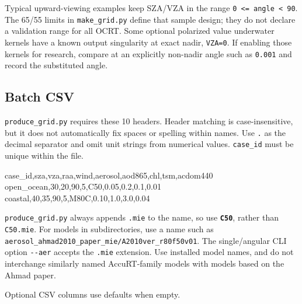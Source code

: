 Typical upward-viewing examples keep SZA/VZA in the range \texttt{0 <=\allowbreak{} angle < 90\textdegree{}}. The 65\textdegree{}/55\textdegree{} limits in \texttt{make\_\allowbreak{}grid.\allowbreak{}py} define that sample design; they do not declare a validation range for all OCRT. Some optional polarized value underwater kernels have a known output singularity at exact nadir, \texttt{VZA=\allowbreak{}0\textdegree{}}. If enabling those kernels for research, compare at an explicitly non-nadir angle such as \texttt{0.\allowbreak{}001\textdegree{}} and record the substituted angle.

\subsection{Batch CSV}
\label{sec:auto:06_python_batch:3.1}
\texttt{produce\_\allowbreak{}grid.\allowbreak{}py} requires these 10 headers. Header matching is case-insensitive, but it does not automatically fix spaces or spelling within names. Use \texttt{.\allowbreak{}} as the decimal separator and omit unit strings from numerical values. \texttt{case\_\allowbreak{}id} must be unique within the file.


\begin{ManualCode}
case_id,sza,vza,raa,wind,aerosol,aod865,chl,tsm,acdom440
open_ocean,30,20,90,5,C50,0.05,0.2,0.1,0.01
coastal,40,35,90,5,M80C,0.10,1.0,3.0,0.04
\end{ManualCode}

\texttt{produce\_\allowbreak{}grid.\allowbreak{}py} always appends \texttt{.\allowbreak{}mie} to the name, so use \textbf{\texttt{C50}}, rather than \texttt{C50.\allowbreak{}mie}. For models in subdirectories, use a name such as \texttt{aerosol\_\allowbreak{}ahmad2010\_\allowbreak{}paper\_\allowbreak{}mie/\allowbreak{}A2010ver\_\allowbreak{}r80f50v01}. The single/angular CLI option \texttt{-\allowbreak{}-\allowbreak{}aer} accepts the \texttt{.\allowbreak{}mie} extension. Use installed model names, and do not interchange similarly named AccuRT-family models with models based on the Ahmad paper.

Optional CSV columns use defaults when empty.


